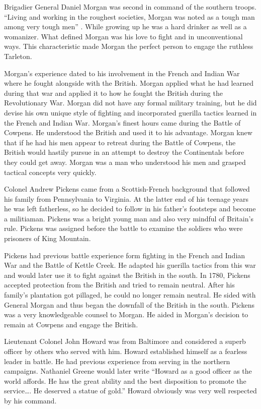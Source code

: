 Brigadier General Daniel Morgan was second in command of the southern troops.
“Living and working in the roughest societies, Morgan was noted as a tough man
among very tough men” \cite[p.116]{lumpkin_savannah_1981}.  While growing up he was a hard drinker
as well as a womanizer. What defined Morgan was his love to fight and in
unconventional ways. This characteristic made Morgan the perfect person to
engage the ruthless Tarleton. 

Morgan’s experience dated to his involvement in the French and Indian War where
he fought alongside with the British.  Morgan applied what he had learned during
that war and applied it to how he fought the British during the Revolutionary
War.  Morgan did not have any formal military training, but he did devise his
own unique style of fighting and incorporated guerilla tactics learned in the
French and Indian War. Morgan’s finest hours came during the Battle of Cowpens.
He understood the British and used it to his advantage.  Morgan knew that if he
had his men appear to retreat during the Battle of Cowpens, the British would
hastily pursue in an attempt to destroy the Continentals before they could get
away.  Morgan was a man who  understood his men and grasped tactical concepts
very quickly.

Colonel Andrew Pickens came from a Scottish-French background that followed his
family from Pennsylvania to Virginia.  At the latter end of his teenage years he
was left fatherless, so he decided to follow in his father’s footsteps and
become a militiaman.  Pickens was a bright young man and also very mindful of
Britain’s rule.  Pickens was assigned before the battle to examine the soldiers
who were prisoners of King Mountain.

Pickens had previous battle experience form fighting in the French and Indian
War and the Battle of Kettle Creek. He adapted his guerilla tactics from this
war and would later use it to fight against the British in the south.  In 1780,
Pickens accepted protection from the British and tried to remain neutral.  After
his family’s plantation got pillaged, he could no longer remain neutral.  He
sided with General Morgan and thus began the downfall of the British in the
south. Pickens was a very knowledgeable counsel to Morgan.  He aided in Morgan’s
decision to remain at Cowpens and engage the British.  

Lieutenant Colonel John Howard was from Baltimore and considered a superb
officer by others who served with him.  Howard established himself as a fearless
leader in battle.  He had previous experience from serving in the northern
campaigns. Nathaniel Greene would later write “Howard as a good officer as the
world affords. He has the great ability and the best disposition to promote the
service…. He deserved a statue of gold.” \cite[26]{babits_devil_2001} Howard obviously was very
well respected by his command. 


